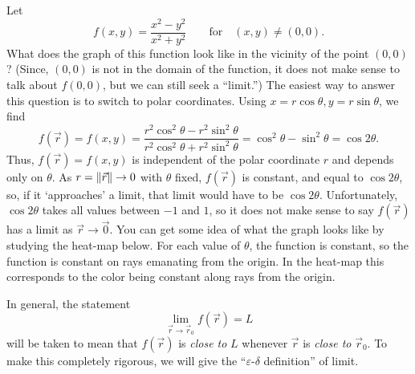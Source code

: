 \begin{example}
	\label{EXDISCONT}
	Let
	\[
	   f(x,y) = \frac{x^2 - y^2}{x^2 + y^2}\qquad\text{for}\quad (x,y) \not= (0,0).
	\]
	 What does the graph of this function look like in the vicinity
	of the point $(0,0)$?   (Since, $(0,0)$ is not in the domain of
	the function, it does not make sense  to talk about
	$f(0,0)$, but we can still seek a ``limit.'')  The easiest way to
	answer this question is to switch to polar coordinates.   Using
	$x = r\cos\theta, y = r\sin\theta$, we find
	\[
	f(\vec r) = f(x,y) = \frac{r^2\cos^2\theta - r^2\sin^2\theta}
	{r^2\cos^2\theta + r^2\sin^2\theta} = \cos^2\theta - \sin^2\theta
	 = \cos 2\theta.
	\]
	Thus, $f(\vec r) = f(x,y)$
	is independent of the polar coordinate $r$ and depends only
	on $\theta$.  As $r = \lVert\vec r\rVert \to 0$ with $\theta$ fixed, $f(\vec r)$
	is constant, and equal to $\cos 2\theta$, so, if  it `approaches'
	a limit, that limit would have to be $\cos 2\theta$.  
	Unfortunately, $\cos 2\theta$ takes all values between $-1$ and $1$, so it
	does not make sense to say $f(\vec r)$ has a limit as $\vec r \to \vec 0$.
	You can get some idea of what the graph looks like by studying the
	heat-map below.  For each value
	of $\theta$, the function is constant, so the function
	is constant on rays emanating from the origin.  In the heat-map
	this corresponds to the color being constant along rays from the origin.

	\begin{center}
	\end{center}
\end{example}

In general, the statement
\[
  \lim_{\vec r \to \vec r_0} f(\vec r) = L
\]
will be taken to mean that $f(\vec r)$ is \emph{close to} $L$ whenever
$\vec r$ is \emph{close to } $\vec r_0$.   To make this completely
rigorous, we will give the ``$\varepsilon$-$\delta$ definition'' of limit.

